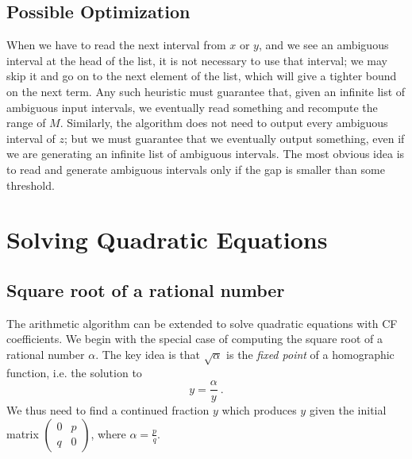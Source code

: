 \documentclass[11pt, oneside]{amsart}   	%
\renewcommand{\:}{\negthickspace:\negthickspace}
\begin{document}
\subsection{Possible Optimization}
When we have to read the next interval from $x$ or $y$, and we see an ambiguous interval at the head of the list, it is not necessary
to use that interval; we may skip it and go on to the next element of the list, which will give a tighter bound on the next term.
Any such heuristic must guarantee that, given an infinite list of ambiguous input intervals, we eventually read something
and recompute the range of $M$. Similarly, the
algorithm does not need to output every ambiguous interval of $z$; but  we must guarantee that we eventually output something,
even if we are generating an infinite list of ambiguous intervals. The most obvious idea is to read and generate ambiguous intervals only if the gap is smaller than some threshold.


\section{Solving Quadratic Equations}
\subsection{Square root of a rational number}
The arithmetic algorithm can be extended to solve quadratic equations with CF coefficients.
We begin with the special case of computing the square root of a rational number $\alpha$. 
The key idea is that $\sqrt{\alpha}$ is the \emph{fixed point} of a homographic function, i.e. the solution to
\[
y = \frac{\alpha}{y}\ .
\]
We thus need to find a continued fraction $y$ which produces $y$ given the initial matrix
$\left(\begin{smallmatrix}
0 & p \\
q & 0
\end{smallmatrix}\right)$, where $\alpha = \frac{p}{q}$.
\end{document}
